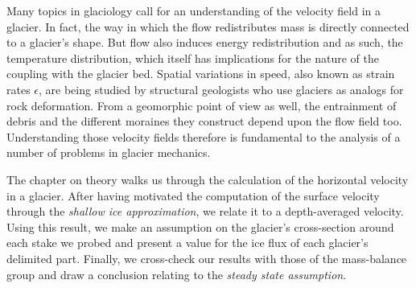\documentclass[11pt]{report}
\begin{document}
\newcommand{\fraction}[2]{\raisebox{0.5ex}{#1} \slash \raisebox{-0.5ex}{#2}}

Many topics in glaciology call for an understanding of the velocity field in a glacier. In fact, the way in which the flow redistributes mass is directly connected to a glacier's shape. But flow also induces energy redistribution and as such, the temperature distribution, which itself has implications for the nature of the coupling with the glacier bed. Spatial variations in speed, also known as strain rates $\epsilon$, are being studied by structural geologists who use glaciers as analogs for rock deformation. From a geomorphic point of view as well, the entrainment of debris and the different moraines they construct depend upon the flow field too. Understanding those velocity fields therefore is fundamental to the analysis of a number of problems in glacier mechanics.


The chapter on theory walks us through the calculation of the horizontal velocity in a glacier. After having motivated the computation of the surface velocity through the \textit{shallow ice approximation}, we relate it to a depth-averaged velocity. Using this result, we make an assumption on the glacier's cross-section around each stake we probed and present a value for the ice flux of each glacier's delimited part. Finally, we cross-check our results with those of the mass-balance group and draw a conclusion relating to the \textit{steady state assumption}.
\end{document}
